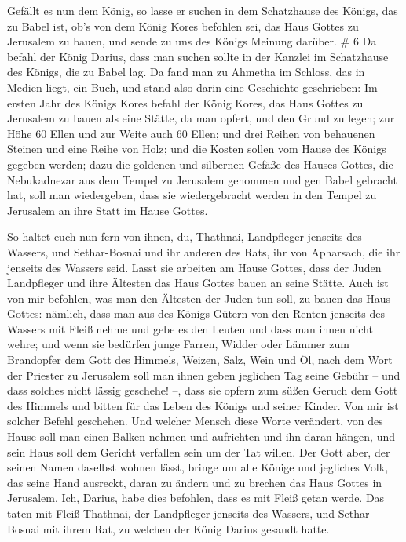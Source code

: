  Gefällt es nun dem König, so lasse er suchen in dem
Schatzhause des Königs, das zu Babel ist, ob's von dem König Kores
befohlen sei, das Haus Gottes zu Jerusalem zu bauen, und sende zu uns
des Königs Meinung darüber. \# 6  Da befahl der König
Darius, dass man suchen sollte in der Kanzlei im Schatzhause des Königs,
die zu Babel lag.  Da fand man zu Ahmetha im Schloss, das in
Medien liegt, ein Buch, und stand also darin eine Geschichte
geschrieben:  Im ersten Jahr des Königs Kores befahl der
König Kores, das Haus Gottes zu Jerusalem zu bauen als eine Stätte, da
man opfert, und den Grund zu legen; zur Höhe 60 Ellen und zur Weite auch
60 Ellen;  und drei Reihen von behauenen Steinen und eine
Reihe von Holz; und die Kosten sollen vom Hause des Königs gegeben
werden;  dazu die goldenen und silbernen Gefäße des Hauses
Gottes, die Nebukadnezar aus dem Tempel zu Jerusalem genommen und gen
Babel gebracht hat, soll man wiedergeben, dass sie wiedergebracht werden
in den Tempel zu Jerusalem an ihre Statt im Hause Gottes.

 So haltet euch nun fern von ihnen, du, Thathnai,
Landpfleger jenseits des Wassers, und Sethar-Bosnai und ihr anderen des
Rats, ihr von Apharsach, die ihr jenseits des Wassers seid. 
Lasst sie arbeiten am Hause Gottes, dass der Juden Landpfleger und ihre
Ältesten das Haus Gottes bauen an seine Stätte.  Auch ist
von mir befohlen, was man den Ältesten der Juden tun soll, zu bauen das
Haus Gottes: nämlich, dass man aus des Königs Gütern von den Renten
jenseits des Wassers mit Fleiß nehme und gebe es den Leuten und dass man
ihnen nicht wehre;  und wenn sie bedürfen junge Farren,
Widder oder Lämmer zum Brandopfer dem Gott des Himmels, Weizen, Salz,
Wein und Öl, nach dem Wort der Priester zu Jerusalem soll man ihnen
geben jeglichen Tag seine Gebühr -- und dass solches nicht lässig
geschehe! --,  dass sie opfern zum süßen Geruch dem Gott
des Himmels und bitten für das Leben des Königs und seiner Kinder.
 Von mir ist solcher Befehl geschehen. Und welcher Mensch
diese Worte verändert, von des Hause soll man einen Balken nehmen und
aufrichten und ihn daran hängen, und sein Haus soll dem Gericht
verfallen sein um der Tat willen.  Der Gott aber, der
seinen Namen daselbst wohnen lässt, bringe um alle Könige und jegliches
Volk, das seine Hand ausreckt, daran zu ändern und zu brechen das Haus
Gottes in Jerusalem. Ich, Darius, habe dies befohlen, dass es mit Fleiß
getan werde.  Das taten mit Fleiß Thathnai, der Landpfleger
jenseits des Wassers, und Sethar-Bosnai mit ihrem Rat, zu welchen der
König Darius gesandt hatte.

